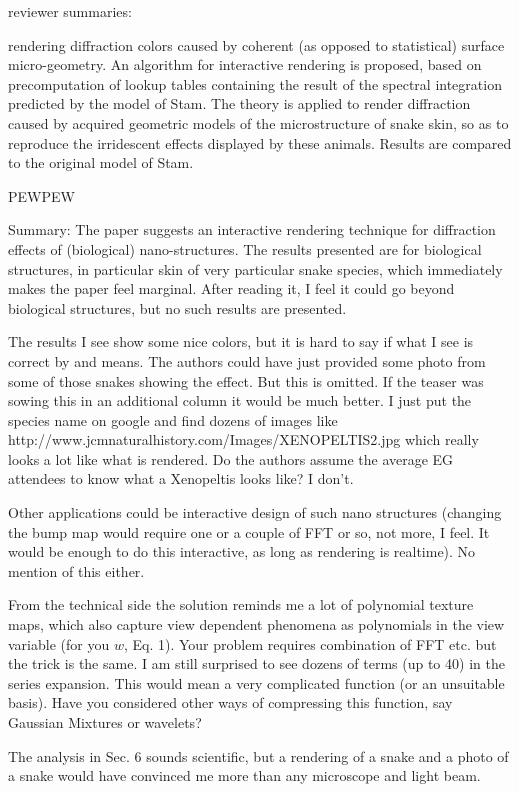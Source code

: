 reviewer summaries:

rendering diffraction colors caused by coherent (as opposed to statistical) surface micro-geometry.  An algorithm
for interactive rendering is proposed, based on precomputation of lookup
tables containing the result of the spectral integration predicted by the
model of Stam. The theory is applied to render diffraction caused by acquired
geometric models of the microstructure of snake skin, so as to reproduce the
irridescent effects displayed by these animals. Results are compared to the
original model of Stam.

PEWPEW

Summary: The paper suggests an interactive rendering technique for diffraction effects of (biological) nano-structures. The results presented are for biological structures, in particular skin of very particular snake species, which immediately makes the paper feel marginal. After reading it, I feel it could go beyond biological structures, but no such results are presented.

The results I see show some nice colors, but it is hard to say if what I see is correct by and means. The authors could have just provided some photo from some of those snakes showing the effect. But this is omitted. If the teaser was sowing this in an additional column it would be much better. I just put the species name on google and find dozens of images like http://www.jcmnaturalhistory.com/Images/XENOPELTIS2.jpg which really looks a lot like what is rendered. Do the authors assume the average EG attendees to know what a Xenopeltis looks like? I don't.

Other applications could be interactive design of such nano structures (changing the bump map would require one or a couple of FFT or so, not more, I feel. It would be enough to do this interactive, as long as rendering is realtime). No mention of this either.

From the technical side the solution reminds me a lot of polynomial texture maps, which also capture view dependent phenomena as polynomials in the view variable (for you $w$, Eq. 1). Your problem requires combination of FFT etc. but the trick is the same. I am still surprised to see dozens of terms (up to 40) in the series expansion. This would mean a very complicated function (or an unsuitable basis). Have you considered other ways of compressing this function, say Gaussian Mixtures or wavelets?

The analysis in Sec. 6 sounds scientific, but a rendering of a snake and a photo of a snake would have convinced me more than any microscope and light beam.

